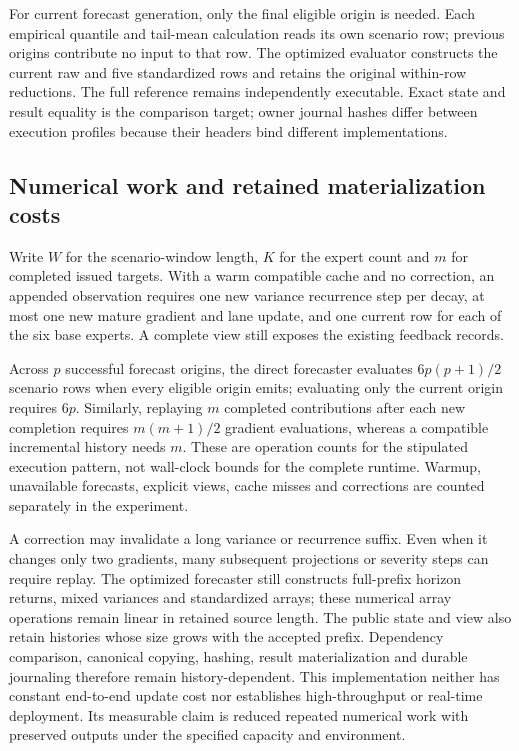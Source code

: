 \documentclass[11pt,a4paper]{article}
\theoremstyle{definition}\newtheorem{definition}[theorem]{Definition}
\begin{document}
For current forecast generation, only the final eligible origin is needed. Each empirical quantile and tail-mean calculation reads its own scenario row; previous origins contribute no input to that row. The optimized evaluator constructs the current raw and five standardized rows and retains the original within-row reductions. The full reference remains independently executable. Exact state and result equality is the comparison target; owner journal hashes differ between execution profiles because their headers bind different implementations.

\subsection{Numerical work and retained materialization costs}
Write $W$ for the scenario-window length, $K$ for the expert count and $m$ for completed issued targets. With a warm compatible cache and no correction, an appended observation requires one new variance recurrence step per decay, at most one new mature gradient and lane update, and one current row for each of the six base experts. A complete view still exposes the existing feedback records.

Across $p$ successful forecast origins, the direct forecaster evaluates $6p(p+1)/2$ scenario rows when every eligible origin emits; evaluating only the current origin requires $6p$. Similarly, replaying $m$ completed contributions after each new completion requires $m(m+1)/2$ gradient evaluations, whereas a compatible incremental history needs $m$. These are operation counts for the stipulated execution pattern, not wall-clock bounds for the complete runtime. Warmup, unavailable forecasts, explicit views, cache misses and corrections are counted separately in the experiment.

A correction may invalidate a long variance or recurrence suffix. Even when it changes only two gradients, many subsequent projections or severity steps can require replay. The optimized forecaster still constructs full-prefix horizon returns, mixed variances and standardized arrays; these numerical array operations remain linear in retained source length. The public state and view also retain histories whose size grows with the accepted prefix. Dependency comparison, canonical copying, hashing, result materialization and durable journaling therefore remain history-dependent. This implementation neither has constant end-to-end update cost nor establishes high-throughput or real-time deployment. Its measurable claim is reduced repeated numerical work with preserved outputs under the specified capacity and environment.
\end{document}
